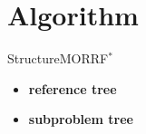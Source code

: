 \section{Algorithm}


\begin{frame}{Structure}{MORRF$^{*}$}
	
\begin{itemize}
	\item \textbf{reference tree}
	\item \textbf{subproblem tree}
\end{itemize}
	
\end{frame}